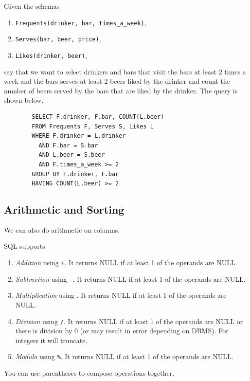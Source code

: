     \begin{example}
      Given the schemas 
      \begin{enumerate}
        \item \texttt{Frequents(drinker, bar, times\_a\_week)}, 
        \item \texttt{Serves(bar, beer, price)}, 
        \item \texttt{Likes(drinker, beer)}, 
      \end{enumerate}
      say that we want to select drinkers and bars that visit the bars at least 2 times a week and the bars serves at least 2 beers liked by the drinker and count the number of beers served by the bars that are liked by the drinker. The query is shown below. 

      \begin{lstlisting}
        SELECT F.drinker, F.bar, COUNT(L.beer) 
        FROM Frequents F, Serves S, Likes L 
        WHERE F.drinker = L.drinker
          AND F.bar = S.bar 
          AND L.beer = S.beer 
          AND F.times_a_week >= 2 
        GROUP BY F.drinker, F.bar 
        HAVING COUNT(L.beer) >= 2 
      \end{lstlisting}
    \end{example}

\subsection{Arithmetic and Sorting} 

  We can also do arithmetic on columns. 

  \begin{definition}
    SQL supports 
    \begin{enumerate}
      \item \textit{Addition} using \texttt{+}. It returns NULL if at least 1 of the operands are NULL. 
      \item \textit{Subtraction} using \texttt{-}. It returns NULL if at least 1 of the operands are NULL. 
      \item \textit{Multiplication} using \texttt{\*}. It returns NULL if at least 1 of the operands are NULL. 
      \item \textit{Division} using \texttt{/}. It returns NULL if at least 1 of the operands are NULL or there is division by $0$ (or may result in error depending on DBMS). For integers it will truncate. 
      \item \textit{Modulo} using \texttt{\%}. It returns NULL if at least 1 of the operands are NULL. 
    \end{enumerate}
    You can use parentheses to compose operations together. 
  \end{definition}

